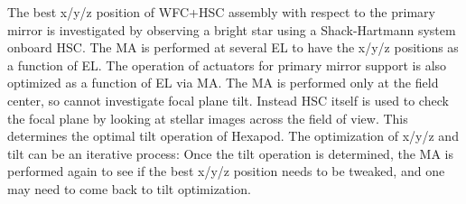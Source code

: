 The best x/y/z position of WFC+HSC assembly with respect to the primary mirror is investigated by observing a bright star using a Shack-Hartmann system onboard HSC. 
The MA is performed at several EL to have the x/y/z positions as a function of EL. The operation of actuators for primary mirror support is also optimized as a function of EL via MA.
The MA is performed only at the field center, so cannot investigate focal plane tilt. Instead HSC itself is used to check the focal plane by looking at stellar images across the field of view. This determines the optimal tilt operation of Hexapod.
The optimization of x/y/z and tilt can be an iterative process: Once the tilt operation is determined, the MA is performed again to see if the best x/y/z position needs to be tweaked, and one may need to come back to tilt optimization.

